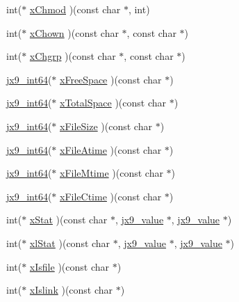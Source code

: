 \begin{DoxyCompactItemize}
int($\ast$ \hyperlink{structjx9__vfs_aa1031c19632a860cf258bb719c6e1b0f}{x\-Chmod} )(const char $\ast$, int)
\item 
int($\ast$ \hyperlink{structjx9__vfs_ac9eba64687b2dd2411dd2c6e2e1c1e1f}{x\-Chown} )(const char $\ast$, const char $\ast$)
\item 
int($\ast$ \hyperlink{structjx9__vfs_a6d57d3d1c0a323343e7f98e4d575bfdd}{x\-Chgrp} )(const char $\ast$, const char $\ast$)
\item 
\hyperlink{unqlite_8c_aeaac5ecf324354b1c4bb9f6559bab7af}{jx9\-\_\-int64}($\ast$ \hyperlink{structjx9__vfs_af34b15851378618509bb6c30abed958a}{x\-Free\-Space} )(const char $\ast$)
\item 
\hyperlink{unqlite_8c_aeaac5ecf324354b1c4bb9f6559bab7af}{jx9\-\_\-int64}($\ast$ \hyperlink{structjx9__vfs_a2942aed70c8a7b61793923b449476a50}{x\-Total\-Space} )(const char $\ast$)
\item 
\hyperlink{unqlite_8c_aeaac5ecf324354b1c4bb9f6559bab7af}{jx9\-\_\-int64}($\ast$ \hyperlink{structjx9__vfs_a258ad7701306ef56e70c2b4812d8a5a1}{x\-File\-Size} )(const char $\ast$)
\item 
\hyperlink{unqlite_8c_aeaac5ecf324354b1c4bb9f6559bab7af}{jx9\-\_\-int64}($\ast$ \hyperlink{structjx9__vfs_a699b0f714ad21b50a83cf02789c861d8}{x\-File\-Atime} )(const char $\ast$)
\item 
\hyperlink{unqlite_8c_aeaac5ecf324354b1c4bb9f6559bab7af}{jx9\-\_\-int64}($\ast$ \hyperlink{structjx9__vfs_abbbcc97776f595af157d9a3592fb52f5}{x\-File\-Mtime} )(const char $\ast$)
\item 
\hyperlink{unqlite_8c_aeaac5ecf324354b1c4bb9f6559bab7af}{jx9\-\_\-int64}($\ast$ \hyperlink{structjx9__vfs_a0d77a353ddc7c6aa456c2bbbedce120c}{x\-File\-Ctime} )(const char $\ast$)
\item 
int($\ast$ \hyperlink{structjx9__vfs_a60629e46759c020f8cd29ec7bd0ba0b9}{x\-Stat} )(const char $\ast$, \hyperlink{structjx9__value}{jx9\-\_\-value} $\ast$, \hyperlink{structjx9__value}{jx9\-\_\-value} $\ast$)
\item 
int($\ast$ \hyperlink{structjx9__vfs_a6d40957e331c4536df1cb687f45eef8f}{xl\-Stat} )(const char $\ast$, \hyperlink{structjx9__value}{jx9\-\_\-value} $\ast$, \hyperlink{structjx9__value}{jx9\-\_\-value} $\ast$)
\item 
int($\ast$ \hyperlink{structjx9__vfs_a5a50796330187bb369959005270adeb2}{x\-Isfile} )(const char $\ast$)
\item 
int($\ast$ \hyperlink{structjx9__vfs_a32afeee1f1b40ba211a0c503663f0117}{x\-Islink} )(const char $\ast$)

\end{DoxyCompactItemize}
